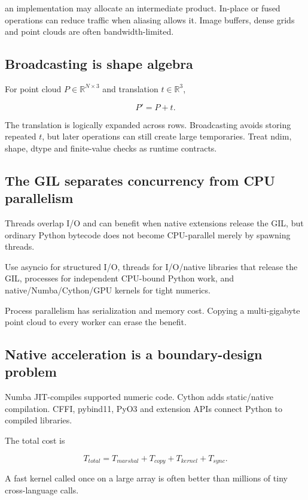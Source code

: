 an implementation may allocate an intermediate product. In-place or fused operations can reduce traffic when aliasing allows it. Image buffers, dense grids and point clouds are often bandwidth-limited.

\subsection{Broadcasting is shape algebra}\label{broadcasting-is-shape-algebra}

For point cloud \(P\in\mathbb R^{N\times3}\) and translation \(t\in\mathbb R^3\),

\[
P'=P+t.
\]

The translation is logically expanded across rows. Broadcasting avoids storing repeated \(t\), but later operations can still create large temporaries. Treat ndim, shape, dtype and finite-value checks as runtime contracts.

\subsection{The GIL separates concurrency from CPU parallelism}\label{the-gil-separates-concurrency-from-cpu-parallelism}

Threads overlap I/O and can benefit when native extensions release the GIL, but ordinary Python bytecode does not become CPU-parallel merely by spawning threads.

Use asyncio for structured I/O, threads for I/O/native libraries that release the GIL, processes for independent CPU-bound Python work, and native/Numba/Cython/GPU kernels for tight numerics.

Process parallelism has serialization and memory cost. Copying a multi-gigabyte point cloud to every worker can erase the benefit.

\subsection{Native acceleration is a boundary-design problem}\label{native-acceleration-is-a-boundary-design-problem}

Numba JIT-compiles supported numeric code. Cython adds static/native compilation. CFFI, pybind11, PyO3 and extension APIs connect Python to compiled libraries.

The total cost is

\[
T_{total}=T_{marshal}+T_{copy}+T_{kernel}+T_{sync}.
\]

A fast kernel called once on a large array is often better than millions of tiny cross-language calls.

